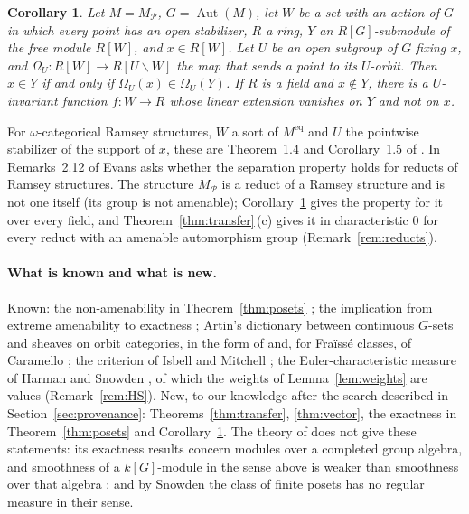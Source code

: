 \documentclass[11pt,a4paper]{article}
\newtheorem{corollary}[theorem]{Corollary}
\theoremstyle{definition}
\newcommand{\Po}{\mathcal{P}}
\newcommand{\Aut}{\operatorname{Aut}}
\begin{document}
\begin{corollary}\label{cor:evans}
Let $M=M_{\Po}$, $G=\Aut(M)$, let $W$ be a set with an action of $G$ in which
every point has an open stabilizer, $R$ a ring, $Y$ an $R[G]$-submodule of
the free module $R[W]$, and $x\in R[W]$. Let $U$ be an open subgroup of $G$
fixing $x$, and $\Omega_U\colon R[W]\to R[U\backslash W]$ the map that sends
a point to its $U$-orbit. Then $x\in Y$ if and only if
$\Omega_U(x)\in\Omega_U(Y)$. If $R$ is a field and $x\notin Y$, there is a
$U$-invariant function $f\colon W\to R$ whose linear extension vanishes on
$Y$ and not on $x$.
\end{corollary}

For $\omega$-categorical Ramsey structures, $W$ a sort of $M^{\mathrm{eq}}$ and $U$ the pointwise stabilizer of the support of $x$, these are Theorem~1.4 and Corollary~1.5 of \cite{Ev}. In Remarks~2.12 of \cite{Ev} Evans asks whether
the separation property holds for reducts of Ramsey structures. The
structure $M_{\Po}$ is a reduct of a Ramsey structure and is not one itself
(its group is not amenable); Corollary~\ref{cor:evans} gives the property for
it over every field, and Theorem~\ref{thm:transfer}\,(c) gives it in
characteristic $0$ for every reduct with an amenable automorphism group
(Remark~\ref{rem:reducts}).

\paragraph{What is known and what is new.} Known: the non-amenability in
Theorem~\ref{thm:posets} \cite{KS}; the implication from extreme amenability
to exactness \cite{Ev}; Artin's dictionary between continuous $G$-sets and
sheaves on orbit categories, in the form of \cite{DLLX} and, for Fra\"iss\'e
classes, of Caramello \cite[Theorem~2.9, Proposition~2.10]{Ca}; the criterion
of Isbell and Mitchell \cite{IM}; the Euler-characteristic measure of Harman
and Snowden \cite{HS}, of which the weights of Lemma~\ref{lem:weights} are
values (Remark~\ref{rem:HS}). New, to our knowledge after the search
described in Section~\ref{sec:provenance}: Theorems~\ref{thm:transfer},
\ref{thm:vector}, the exactness in Theorem~\ref{thm:posets} and
Corollary~\ref{cor:evans}. The theory of \cite{HS} does not give these
statements: its exactness results concern modules over a completed group
algebra, and smoothness of a $k[G]$-module in the sense above is weaker than smoothness over that algebra \cite[Remark~10.10]{HS}; and by Snowden \cite[Proposition~8.2]{Sn} the
class of finite posets has no regular measure in their sense.
\end{document}
